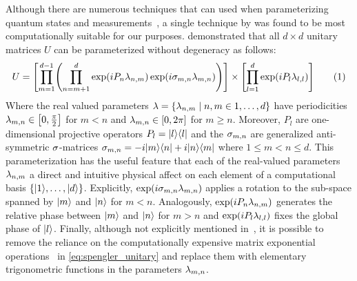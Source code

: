\documentclass[aps, 10pt, english, twoside, pra, nofootinbib, tightenlines, longbibliography, superscriptaddress]{revtex4-1}
\begin{document}
    Although there are numerous techniques that can used when parameterizing quantum states and measurements~\cite{Petz_2015, Hedemann_2013,Fujii_2005,James_2001,Grasmair_2014,Neilsen_Chaung_2011}, a single technique by \citet{Spengler_2010_Unitary} was found to be most computationally suitable for our purposes.  demonstrated that all $d\times d$ unitary matrices $U$ can be parameterized without degeneracy as follows:
    \[ U = \bs{\prod_{m=1}^{d-1} \br{\prod_{n=m+1}^{d} \exp\br{i P_n \lambda_{n,m}}\exp\br{i \si_{m,n} \lambda_{m,n}}}} \times \bs{\prod_{l=1}^{d} \exp\br{iP_l \lambda_{l,l}}}  \eq \label{eq:spengler_unitary} \]
    Where the real valued parameters $\la = \bc{\la_{n,m} \mid n,m \in 1, \ldots, d}$ have periodicities $\la_{m,n} \in \bs{0, \f{\pi}{2}}$ for $m < n$ and $\la_{m,n} \in \bs{0, 2 \pi}$ for $m \geq n$. Moreover, $P_l$ are one-dimensional projective operators $P_l = \ket{l}\bra{l}$ and the $\sigma_{m,n}$ are generalized anti-symmetric $\sigma$-matrices $\sigma_{m,n} = -i \ket{m}\bra{n} +i \ket{n}\bra{m}$ where $1 \leq m < n \leq d$. This parameterization has the useful feature that each of the real-valued parameters $\lambda_{n,m}$ a direct and intuitive physical affect on each element of a computational basis $\bc{\ket{1}, \ldots, \ket{d}}$. Explicitly, $\exp\br{i \si_{m,n} \lambda_{m,n}}$ applies a rotation to the sub-space spanned by $\ket{m}$ and $\ket{n}$ for $m < n$. Analogously, $\exp\br{i P_n \lambda_{n,m}}$ generates the relative phase between $\ket{m}$ and $\ket{n}$ for $m > n$ and $\exp\br{iP_l \lambda_{l,l}}$ fixes the global phase of $\ket{l}$. Finally, although not explicitly mentioned in~\cite{Spengler_2010_Unitary}, it is possible to remove the reliance on the computationally expensive matrix exponential operations~\cite{Moler_2003} in \cref{eq:spengler_unitary} and replace them with elementary trigonometric functions in the parameters $\lambda_{m,n}$.
\end{document}
